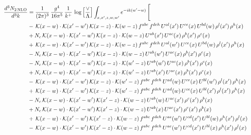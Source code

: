 \documentclass[9pt]{article}
\numberwithin{equation}{section}
\begin{document}
\begin{align}
\frac{d^{3}N_{2\,\mathrm{NLO}}}{d^{3}k} & = \frac{1}{(2\pi)^{3}}\,\frac{g^{4}}{16\pi^{5}}\,\frac{1}{k^{+}}\,\log\Big[\frac{\vee}{\Lambda}\Big]\int_{x,x',z,w,w'}e^{-ik(w'-w)}\,\Bigg[\notag\\ & -\,\mathcal{K}(x-w)\cdot\mathcal{K}(x'-w')\,\mathcal{K}(x-z)\cdot\mathcal{K}(w-z)\,f^{abc}\,f^{deh}\,U^{al}(x')\,U^{ce}(x)\,U^{bd}(w)\,\rho^{l}(x')\,\rho^{h}(x)\notag\\
& +N_{c}\,\mathcal{K}(x-w)\cdot\mathcal{K}(x'-w')\,\mathcal{K}(x-z)\cdot\mathcal{K}(w-z)\,U^{ab}(x')\,U^{ac}(x)\,\rho^{b}(x')\,\rho^{c}(x)\notag\\
& +\,\mathcal{K}(x-w)\cdot\mathcal{K}(x'-w')\,\mathcal{K}(x-z)\cdot\mathcal{K}(w-z)\,f^{abc}\,f^{deh}\,U^{al}(w')\,U^{ce}(x)\,U^{bd}(w)\,\rho^{l}(x')\,\rho^{h}(x)\notag\\
& -N_{c}\,\mathcal{K}(x-w)\cdot\mathcal{K}(x'-w')\,\mathcal{K}(x-z)\cdot\mathcal{K}(w-z)\,U^{ab}(w')\,U^{ac}(x)\,\rho^{b}(x')\,\rho^{c}(x)\notag\\
& -N_{c}\,\mathcal{K}(x-w)\cdot\mathcal{K}(x'-w')\,\mathcal{K}(x-z)\cdot\mathcal{K}(w'-z)\,U^{ab}(w')\,U^{ac}(x)\,\rho^{b}(x')\,\rho^{c}(x)\notag\\
& +N_{c}\,\mathcal{K}(x-w)\cdot\mathcal{K}(x'-w')\,\mathcal{K}(x-z)\cdot\mathcal{K}(w'-z)\,U^{ab}(x')\,U^{ac}(x)\,\rho^{b}(x')\,\rho^{c}(x)\notag\\
& -\,\mathcal{K}(x-w)\cdot\mathcal{K}(x'-w')\,\mathcal{K}(x-z)\cdot\mathcal{K}(w'-z)\,f^{abc}\,f^{deh}\,U^{ad}(w)\,U^{ce}(x)\,U^{bl}(w')\,\rho^{l}(x')\,\rho^{h}(x)\notag\\
& +\,\mathcal{K}(x-w)\cdot\mathcal{K}(x'-w')\,\mathcal{K}(x-z)\cdot\mathcal{K}(w'-z)\,f^{abc}\,f^{deh}\,U^{ad}(w)\,U^{ce}(x)\,U^{bl}(x')\,\rho^{l}(x')\,\rho^{h}(x)\notag\\
& -N_{c}\,\mathcal{K}(x-w)\cdot\mathcal{K}(x'-w')\,\mathcal{K}(x'-z)\cdot\mathcal{K}(w-z)\,U^{ab}(w)\,U^{ac}(x')\,\rho^{c}(x')\,\rho^{b}(x)\notag\\
& +N_{c}\,\mathcal{K}(x-w)\cdot\mathcal{K}(x'-w')\,\mathcal{K}(x'-z)\cdot\mathcal{K}(w-z)\,U^{ab}(x)\,U^{ac}(x')\,\rho^{c}(x')\,\rho^{b}(x)\notag\\
& +\,\mathcal{K}(x-w)\cdot\mathcal{K}(x'-w')\,\mathcal{K}(x'-z)\cdot\mathcal{K}(w-z)\,f^{abc}\,f^{deh}\,U^{ae}(w')\,U^{cd}(x')\,U^{bl}(w)\,\rho^{h}(x')\,\rho^{l}(x)\notag\\
& -\,\mathcal{K}(x-w)\cdot\mathcal{K}(x'-w')\,\mathcal{K}(x'-z)\cdot\mathcal{K}(w-z)\,f^{abc}\,f^{deh}\,U^{ae}(w')\,U^{cd}(x')\,U^{bl}(x)\,\rho^{h}(x')\,\rho^{l}(x)\notag\\

\end{align}
\end{document}
